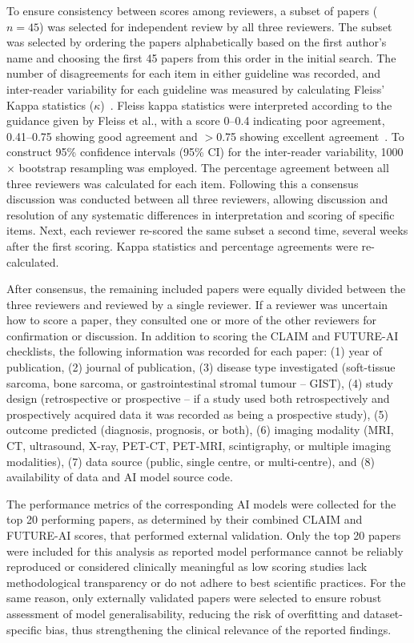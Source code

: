 To ensure consistency between scores among reviewers, a subset of papers ($n = 45$) was selected for independent review by all three reviewers.
The subset was selected by ordering the papers alphabetically based on the first author's name and choosing the first 45 papers from this order in the initial search.
The number of disagreements for each item in either guideline was recorded, and inter-reader variability for each guideline was measured by calculating Fleiss' Kappa statistics ($\kappa$)~\autocite{fleiss2003}.
Fleiss kappa statistics were interpreted according to the guidance given by Fleiss et al., with a score 0--0.4 indicating poor agreement, 0.41--0.75 showing good agreement and $>$0.75 showing excellent agreement~\autocite{fleiss2003}.
To construct 95\% confidence intervals (95\% CI) for the inter-reader variability, 1000$\times$ bootstrap resampling was employed.
The percentage agreement between all three reviewers was calculated for each item.
Following this a consensus discussion was conducted between all three reviewers, allowing discussion and resolution of any systematic differences in interpretation and scoring of specific items.
Next, each reviewer re-scored the same subset a second time, several weeks after the first scoring.
Kappa statistics and percentage agreements were re-calculated.

After consensus, the remaining included papers were equally divided between the three reviewers and reviewed by a single reviewer.
If a reviewer was uncertain how to score a paper, they consulted one or more of the other reviewers for confirmation or discussion.
In addition to scoring the CLAIM and FUTURE-AI checklists, the following information was recorded for each paper: (1) year of publication, (2) journal of publication, (3) disease type investigated (soft-tissue sarcoma, bone sarcoma, or gastrointestinal stromal tumour -- GIST), (4) study design (retrospective or prospective -- if a study used both retrospectively and prospectively acquired data it was recorded as being a prospective study), (5) outcome predicted (diagnosis, prognosis, or both), (6) imaging modality (MRI, CT, ultrasound, X-ray, PET-CT, PET-MRI, scintigraphy, or multiple imaging modalities), (7) data source (public, single centre, or multi-centre), and (8) availability of data and AI model source code.

The performance metrics of the corresponding AI models were collected for the top 20 performing papers, as determined by their combined CLAIM and FUTURE-AI scores, that performed external validation.
Only the top 20 papers were included for this analysis as reported model performance cannot be reliably reproduced or considered clinically meaningful as low scoring studies lack methodological transparency or do not adhere to best scientific practices.
For the same reason, only externally validated papers were selected to ensure robust assessment of model generalisability, reducing the risk of overfitting and dataset-specific bias, thus strengthening the clinical relevance of the reported findings.


